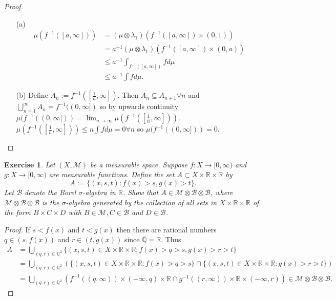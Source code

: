 \documentclass{article}
\newtheorem{exercise}[theorem]{Exercise}
\begin{document}
\begin{proof}
\begin{enumerate}
    \item[(a)] \begin{align*}\mu(f^{-1}([a,\infty]))&=(\mu\otimes\lambda_1)(f^{-1}([a,\infty])\times(0 ,1))\\&=a^{-1}(\mu\otimes\lambda_1)(f^{-1}([a,\infty])\times(0,a))\\&\leq a^{-1}\int_{f^{-1}([a,\infty])}fd\mu\\&\leq a^{-1}\int fd\mu.\end{align*}
    \item[(b)] Define $A_n:=f^{-1}([\frac{1}{n},\infty])$. Then $A_n\subseteq A_{n+1}\forall n$ and $\bigcup_{n=1}^\infty A_n=f^{-1}((0,\infty])$ so by upwards continuity $\mu(f^{-1}((0,\infty]))=\lim_{n\to\infty}\mu(f^{-1}([\frac{1}{n},\infty]))$. $\mu(f^{-1}([\frac{1}{n},\infty]))\leq n\int fd\mu=0\forall n$ so $\mu(f^{-1}((0,\infty]))=0$. 
\end{enumerate}
\end{proof}
\begin{exercise}
Let \((X, \mathcal{M})\) be a measurable space. Suppose \( f : X \to [0, \infty) \) and \( g : X \to [0, \infty) \) are measurable functions. Define the set \( A \subset X \times \mathbb{R} \times \mathbb{R} \) by 
    \[
    A := \{(x, s, t) : f(x) > s, g(x) > t\}.
    \]
    Let \( \mathcal{B} \) denote the Borel \(\sigma\)-algebra in \( \mathbb{R} \). Show that \( A \in \mathcal{M} \otimes \mathcal{B} \otimes \mathcal{B} \), where \( \mathcal{M} \otimes \mathcal{B} \otimes \mathcal{B} \) is the \(\sigma\)-algebra generated by the collection of all sets in \( X \times \mathbb{R} \times \mathbb{R} \) of the form \( B \times C \times D \) with \( B \in \mathcal{M}, C \in \mathcal{B} \) and \( D \in \mathcal{B} \).
\end{exercise}
\begin{proof}
If $s<f(x)$ and $t<g(x)$ then there are rational numbers $q\in(s,f(x))$ and $r\in(t,g(x))$ since $\overline{\mathbb{Q}}=\mathbb{R}$. Thus \begin{align*}
    A&=\bigcup_{(q,r)\in\mathbb{Q}^2}\{(x,s,t)\in X\times\mathbb{R}\times\mathbb{R}:f(x)>q>s,g(x)>r>t\}\\&=\bigcup_{(q,r)\in\mathbb{Q}^2}(\{(x,s,t)\in X\times\mathbb{R}\times\mathbb{R}:f(x)>q>s\}\cap\{(x,s,t)\in X\times\mathbb{R}\times\mathbb{R}:g(x)>r>t\})\\&=\bigcup_{(q,r)\in\mathbb{Q}^2}(f^{-1}((q,\infty))\times(-\infty,q)\times\mathbb{R}\cap g^{-1}((r,\infty))\times\mathbb{R}\times(-\infty,r))\in\mathcal{M}\otimes\mathcal{B}\otimes\mathcal{B}.\end{align*}
\end{proof}
\end{document}
